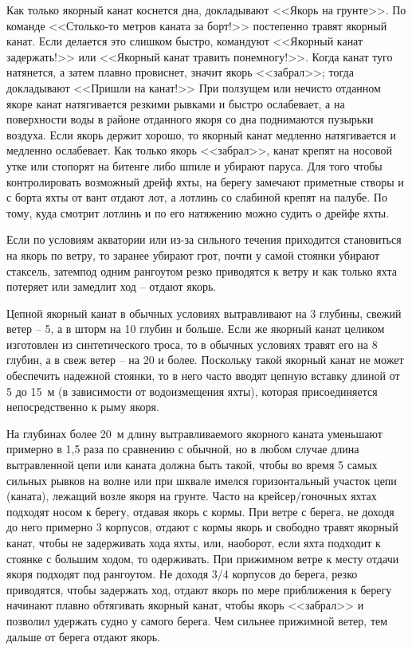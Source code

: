 Как только якорный канат коснется дна, докладывают <<Якорь на грунте>>. По команде <<Столько-то метров каната за борт!>> постепенно травят якорный канат. Если делается это слишком быстро, командуют <<Якорный канат задержать!>> или <<Якорный канат травить понемногу!>>. Когда канат туго натянется, а затем плавно провиснет, значит якорь <<забрал>>; тогда докладывают <<Пришли на канат!>> При ползущем или нечисто отданном якоре канат натягивается резкими рывками и быстро ослабевает, а на поверхности воды в районе отданного якоря со дна поднимаются пузырьки воздуха. Если якорь держит хорошо, то якорный канат медленно натягивается и медленно ослабевает. Как только якорь <<забрал>>, канат крепят на носовой утке или стопорят на битенге либо шпиле и убирают паруса. Для того чтобы контролировать возможный дрейф яхты, на берегу замечают приметные створы и с борта яхты от вант отдают лот, а лотлинь со слабиной крепят на палубе. По тому, куда смотрит лотлинь и по его натяжению можно судить о дрейфе яхты.

Если по условиям акватории или из-за сильного течения приходится становиться на якорь по ветру, то заранее убирают грот, почти у самой стоянки убирают стаксель, затемпод одним рангоутом резко приводятся к ветру и как только яхта потеряет или замедлит ход \--- отдают якорь.

Цепной якорный канат в обычных условиях вытравливают на 3 глубины, свежий ветер \--- 5, а в шторм на 10 глубин и больше. Если же якорный канат целиком изготовлен из синтетического троса, то в обычных условиях травят его на 8 глубин, а в свеж ветер \--- на 20 и более. Поскольку такой якорный канат не может обеспечить надежной стоянки, то в него часто вводят цепную вставку длиной от 5 до 15~м (в зависимости от водоизмещения яхты), которая присоединяется непосредственно к рыму якоря.

На глубинах более 20~м длину вытравливаемого якорного каната уменьшают примерно в 1,5 раза по сравнению с обычной, но в любом случае длина вытравленной цепи или каната должна быть такой, чтобы во время 5 самых сильных рывков на волне или при шквале имелся горизонтальный участок цепи (каната), лежащий возле якоря на грунте. Часто на крейсер\-/гоночных яхтах подходят носом к берегу, отдавая якорь с кормы. При ветре с берега, не доходя до него примерно 3 корпусов, отдают с кормы якорь и свободно травят якорный канат, чтобы не задерживать хода яхты, или, наоборот, если яхта подходит к стоянке с большим ходом, то одерживать. При прижимном ветре к месту отдачи якоря подходят под рангоутом. Не доходя 3\-/4 корпусов до берега, резко приводятся, чтобы задержать ход, отдают якорь по мере приближения к берегу начинают плавно обтягивать якорный канат, чтобы якорь <<забрал>> и позволил удержать судно у самого берега. Чем сильнее прижимной ветер, тем дальше от берега отдают якорь.

